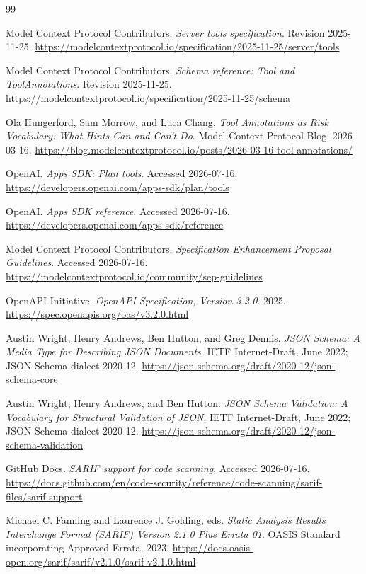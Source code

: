 \documentclass[11pt,letterpaper]{article}
\begin{document}
\small
\begin{thebibliography}{99}

Model Context Protocol Contributors. \emph{Server tools specification}. Revision 2025-11-25.
\url{https://modelcontextprotocol.io/specification/2025-11-25/server/tools}

Model Context Protocol Contributors. \emph{Schema reference: Tool and ToolAnnotations}. Revision 2025-11-25.
\url{https://modelcontextprotocol.io/specification/2025-11-25/schema}

Ola Hungerford, Sam Morrow, and Luca Chang. \emph{Tool Annotations as Risk Vocabulary: What Hints Can and Can't Do}. Model Context Protocol Blog, 2026-03-16.
\url{https://blog.modelcontextprotocol.io/posts/2026-03-16-tool-annotations/}

OpenAI. \emph{Apps SDK: Plan tools}. Accessed 2026-07-16.
\url{https://developers.openai.com/apps-sdk/plan/tools}

OpenAI. \emph{Apps SDK reference}. Accessed 2026-07-16.
\url{https://developers.openai.com/apps-sdk/reference}

Model Context Protocol Contributors. \emph{Specification Enhancement Proposal Guidelines}. Accessed 2026-07-16.
\url{https://modelcontextprotocol.io/community/sep-guidelines}

OpenAPI Initiative. \emph{OpenAPI Specification, Version 3.2.0}. 2025.
\url{https://spec.openapis.org/oas/v3.2.0.html}

Austin Wright, Henry Andrews, Ben Hutton, and Greg Dennis. \emph{JSON Schema: A Media Type for Describing JSON Documents}. IETF Internet-Draft, June 2022; JSON Schema dialect 2020-12.
\url{https://json-schema.org/draft/2020-12/json-schema-core}

Austin Wright, Henry Andrews, and Ben Hutton. \emph{JSON Schema Validation: A Vocabulary for Structural Validation of JSON}. IETF Internet-Draft, June 2022; JSON Schema dialect 2020-12.
\url{https://json-schema.org/draft/2020-12/json-schema-validation}

GitHub Docs. \emph{SARIF support for code scanning}. Accessed 2026-07-16.
\url{https://docs.github.com/en/code-security/reference/code-scanning/sarif-files/sarif-support}

Michael C. Fanning and Laurence J. Golding, eds. \emph{Static Analysis Results Interchange Format (SARIF) Version 2.1.0 Plus Errata 01}. OASIS Standard incorporating Approved Errata, 2023.
\url{https://docs.oasis-open.org/sarif/sarif/v2.1.0/sarif-v2.1.0.html}


\end{thebibliography}
\end{document}
